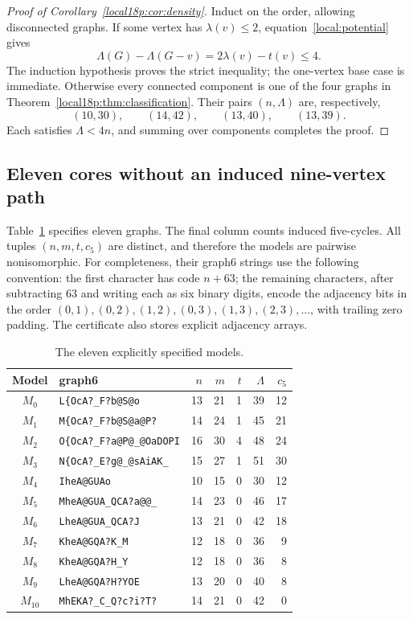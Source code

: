 \documentclass[11pt,a4paper]{article}
\theoremstyle{definition}\newtheorem{definition}[theorem]{Definition}
\theoremstyle{remark}\newtheorem{remark}[theorem]{Remark}
\begin{document}
\begin{proof}[Proof of Corollary~\ref{local18p:cor:density}]
Induct on the order, allowing disconnected graphs. If some vertex has
$\lambda(v)\le2$, equation~\eqref{local:potential} gives
\[
 \Lambda(G)-\Lambda(G-v)=2\lambda(v)-t(v)\le4.
\]
The induction hypothesis proves the strict inequality; the one-vertex
base case is immediate. Otherwise every connected component is one of
the four graphs in Theorem~\ref{local18p:thm:classification}. Their pairs $(n,\Lambda)$
are, respectively,
\[
 (10,30),\qquad(14,42),\qquad(13,40),\qquad(13,39).
\]
Each satisfies $\Lambda<4n$, and summing over components completes the proof.
\end{proof}



\subsection{Eleven cores without an induced nine-vertex path}


Table~\ref{local19:tab:models} specifies eleven graphs. The final column counts
induced five-cycles. All tuples $(n,m,t,c_5)$ are distinct, and therefore
the models are pairwise nonisomorphic.
For completeness, their graph6 strings use the following convention:
the first character has code $n+63$; the remaining characters, after
subtracting 63 and writing each as six binary digits, encode the
adjacency bits in the order
$(0,1),(0,2),(1,2),(0,3),(1,3),(2,3),\ldots$, with trailing zero padding.
The certificate also stores explicit adjacency arrays.

\begin{table}[ht]
\centering\small
\begin{tabular}{clrrrrr}
\toprule
Model&graph6&$n$&$m$&$t$&$\Lambda$&$c_5$\\\midrule
$M_{0}$&\texttt{L\{OcA?\_F?b@S@o}&13&21&1&39&12\\
$M_{1}$&\texttt{M\{OcA?\_F?b@S@a@P?}&14&24&1&45&21\\
$M_{2}$&\texttt{O\{OcA?\_F?a@P@\_@OaDOPI}&16&30&4&48&24\\
$M_{3}$&\texttt{N\{OcA?\_E?g@\_@sAiAK\_}&15&27&1&51&30\\
$M_{4}$&\texttt{IheA@GUAo}&10&15&0&30&12\\
$M_{5}$&\texttt{MheA@GUA\_QCA?a@@\_}&14&23&0&46&17\\
$M_{6}$&\texttt{LheA@GUA\_QCA?J}&13&21&0&42&18\\
$M_{7}$&\texttt{KheA@GQA?K\_M}&12&18&0&36&9\\
$M_{8}$&\texttt{KheA@GQA?H\_Y}&12&18&0&36&8\\
$M_{9}$&\texttt{LheA@GQA?H?YOE}&13&20&0&40&8\\
$M_{10}$&\texttt{MhEKA?\_C\_Q?c?i?T?}&14&21&0&42&0\\
\bottomrule
\end{tabular}
\caption{The eleven explicitly specified models.}\label{local19:tab:models}
\end{table}
\end{document}
